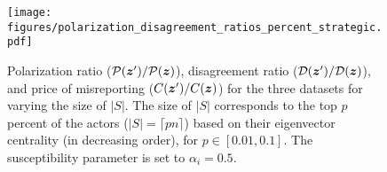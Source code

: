 \begin{figure}
    \centering
    \texttt{[image: figures/polarization\_disagreement\_ratios\_percent\_strategic.pdf]}
    \caption{Polarization ratio ($\mathcal P(\bm{z}^\prime)/\mathcal P(\bm{z})$), disagreement ratio ($\mathcal D(\bm{z}^\prime) / \mathcal D(\bm{z})$), and price of misreporting ($C(\bm{z}^\prime) / C(\bm{z})$) for the three datasets for varying the size of $|S|$. The size of $|S|$ corresponds to the top $p$ percent of the actors ($|S| = \lceil p n \rceil$) based on their eigenvector centrality (in decreasing order), for $p \in [0.01, 0.1]$. The susceptibility parameter is set to $\alpha_i = 0.5$.} 
    \label{fig:ratios_number_of_deviators}
\end{figure}












